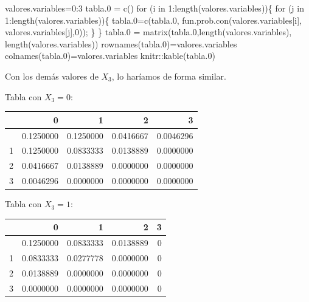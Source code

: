 \documentclass[
  letterpaper,
  DIV=11,
  numbers=noendperiod]{scrreprt}
\newenvironment{Shaded}{\begin{snugshade}}{\end{snugshade}}
\newcommand{\ControlFlowTok}[1]{\textcolor[rgb]{0.00,0.23,0.31}{#1}}
\newcommand{\DecValTok}[1]{\textcolor[rgb]{0.68,0.00,0.00}{#1}}
\newcommand{\FloatTok}[1]{\textcolor[rgb]{0.68,0.00,0.00}{#1}}
\newcommand{\FunctionTok}[1]{\textcolor[rgb]{0.28,0.35,0.67}{#1}}
\newcommand{\NormalTok}[1]{\textcolor[rgb]{0.00,0.23,0.31}{#1}}
\newcommand{\OtherTok}[1]{\textcolor[rgb]{0.00,0.23,0.31}{#1}}
\newcommand{\SpecialCharTok}[1]{\textcolor[rgb]{0.37,0.37,0.37}{#1}}
\begin{document}
\begin{Shaded}
\begin{Highlighting}[]
\NormalTok{valores.variables}\OtherTok{=}\DecValTok{0}\SpecialCharTok{:}\DecValTok{3}
\NormalTok{tabla}\FloatTok{.0} \OtherTok{=} \FunctionTok{c}\NormalTok{()}
\ControlFlowTok{for}\NormalTok{ (i }\ControlFlowTok{in} \DecValTok{1}\SpecialCharTok{:}\FunctionTok{length}\NormalTok{(valores.variables))\{}
  \ControlFlowTok{for}\NormalTok{ (j }\ControlFlowTok{in} \DecValTok{1}\SpecialCharTok{:}\FunctionTok{length}\NormalTok{(valores.variables))\{}
\NormalTok{  tabla}\FloatTok{.0}\OtherTok{=}\FunctionTok{c}\NormalTok{(tabla}\FloatTok{.0}\NormalTok{,}
            \FunctionTok{fun.prob.con}\NormalTok{(valores.variables[i],}
\NormalTok{                         valores.variables[j],}\DecValTok{0}\NormalTok{));}
\NormalTok{  \}}
\NormalTok{  \}}
\NormalTok{tabla}\FloatTok{.0} \OtherTok{=} \FunctionTok{matrix}\NormalTok{(tabla}\FloatTok{.0}\NormalTok{,}\FunctionTok{length}\NormalTok{(valores.variables),}
                 \FunctionTok{length}\NormalTok{(valores.variables))}
\FunctionTok{rownames}\NormalTok{(tabla}\FloatTok{.0}\NormalTok{)}\OtherTok{=}\NormalTok{valores.variables}
\FunctionTok{colnames}\NormalTok{(tabla}\FloatTok{.0}\NormalTok{)}\OtherTok{=}\NormalTok{valores.variables}
\NormalTok{knitr}\SpecialCharTok{::}\FunctionTok{kable}\NormalTok{(tabla}\FloatTok{.0}\NormalTok{)}
\end{Highlighting}
\end{Shaded}

Con los demás valores de \(X_3\), lo haríamos de forma similar.

Tabla con \(X_3=0\):

\begin{longtable}[]{@{}lrrrr@{}}
\toprule\noalign{}
& 0 & 1 & 2 & 3 \\
\midrule\noalign{}
\endhead
\bottomrule\noalign{}
\endlastfoot
0 & 0.1250000 & 0.1250000 & 0.0416667 & 0.0046296 \\
1 & 0.1250000 & 0.0833333 & 0.0138889 & 0.0000000 \\
2 & 0.0416667 & 0.0138889 & 0.0000000 & 0.0000000 \\
3 & 0.0046296 & 0.0000000 & 0.0000000 & 0.0000000 \\
\end{longtable}

Tabla con \(X_3=1\):

\begin{longtable}[]{@{}lrrrr@{}}
\toprule\noalign{}
& 0 & 1 & 2 & 3 \\
\midrule\noalign{}
\endhead
\bottomrule\noalign{}
\endlastfoot
0 & 0.1250000 & 0.0833333 & 0.0138889 & 0 \\
1 & 0.0833333 & 0.0277778 & 0.0000000 & 0 \\
2 & 0.0138889 & 0.0000000 & 0.0000000 & 0 \\
3 & 0.0000000 & 0.0000000 & 0.0000000 & 0 \\
\end{longtable}
\end{document}
